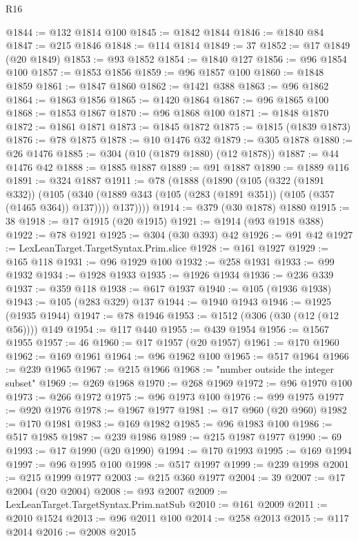 \begin{lexlean}{R16}
\begin{coremodule}
@1844 := @132 @1814 @100
@1845 := @1842 @1844
@1846 := @1840 @84
@1847 := @215 @1846
@1848 := @114 @1814
@1849 := 37
@1852 := @17 @1849 (@20 @1849)
@1853 := @93 @1852
@1854 := @1840 @127
@1856 := @96 @1854 @100
@1857 := @1853 @1856
@1859 := @96 @1857 @100
@1860 := @1848 @1859
@1861 := @1847 @1860
@1862 := @1421 @388
@1863 := @96 @1862
@1864 := @1863 @1856
@1865 := @1420 @1864
@1867 := @96 @1865 @100
@1868 := @1853 @1867
@1870 := @96 @1868 @100
@1871 := @1848 @1870
@1872 := @1861 @1871
@1873 := @1845 @1872
@1875 := @1815 (@1839 @1873)
@1876 := @78 @1875
@1878 := @10 @1476 @32
@1879 := @305 @1878
@1880 := @26 @1476
@1885 := @304 (@10 (@1879 @1880) (@12 @1878))
@1887 := @44 @1476 @42
@1888 := @1885 @1887
@1889 := @91 @1887
@1890 := @1889 @116
@1891 := @324 @1887
@1911 := @78
    (@1888
      (@1890
        (@105
          (@322 (@1891 @332))
          (@105
            (@340 (@1889 @343 (@105 (@283 (@1891 @351)) (@105 (@357 (@1465 @364)) @137))))
            @137))))
@1914 := @379 (@30 @1878) @1880
@1915 := 38
@1918 := @17 @1915 (@20 @1915)
@1921 := @1914 (@93 @1918 @388)
@1922 := @78 @1921
@1925 := @304 (@30 @393) @42
@1926 := @91 @42
@1927 := LexLeanTarget.TargetSyntax.Prim.slice
@1928 := @161 @1927
@1929 := @165 @118
@1931 := @96 @1929 @100
@1932 := @258 @1931
@1933 := @99 @1932
@1934 := @1928 @1933
@1935 := @1926 @1934
@1936 := @236 @339
@1937 := @359 @118
@1938 := @617 @1937
@1940 := @105 (@1936 @1938)
@1943 := @105 (@283 @329) @137
@1944 := @1940 @1943
@1946 := @1925 (@1935 @1944)
@1947 := @78 @1946
@1953 := @1512 (@306 (@30 (@12 (@12 @56)))) @149
@1954 := @117 @440
@1955 := @439 @1954
@1956 := @1567 @1955
@1957 := 46
@1960 := @17 @1957 (@20 @1957)
@1961 := @170 @1960
@1962 := @169 @1961
@1964 := @96 @1962 @100
@1965 := @517 @1964
@1966 := @239 @1965
@1967 := @215 @1966
@1968 := "number outside the integer subset"
@1969 := @269 @1968
@1970 := @268 @1969
@1972 := @96 @1970 @100
@1973 := @266 @1972
@1975 := @96 @1973 @100
@1976 := @99 @1975
@1977 := @920 @1976
@1978 := @1967 @1977
@1981 := @17 @960 (@20 @960)
@1982 := @170 @1981
@1983 := @169 @1982
@1985 := @96 @1983 @100
@1986 := @517 @1985
@1987 := @239 @1986
@1989 := @215 @1987 @1977
@1990 := 69
@1993 := @17 @1990 (@20 @1990)
@1994 := @170 @1993
@1995 := @169 @1994
@1997 := @96 @1995 @100
@1998 := @517 @1997
@1999 := @239 @1998
@2001 := @215 @1999 @1977
@2003 := @215 @360 @1977
@2004 := 39
@2007 := @17 @2004 (@20 @2004)
@2008 := @93 @2007
@2009 := LexLeanTarget.TargetSyntax.Prim.natSub
@2010 := @161 @2009
@2011 := @2010 @1524
@2013 := @96 @2011 @100
@2014 := @258 @2013
@2015 := @117 @2014
@2016 := @2008 @2015

\end{coremodule}
\end{lexlean}
